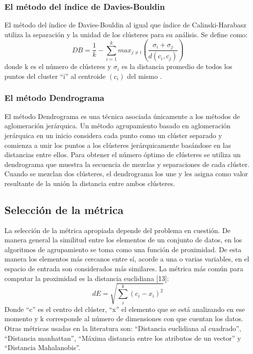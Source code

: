 \subsubsection{El método del índice de Davies-Bouldin }
El método del índice de Davies-Bouldin al igual que índice de Calinski-Harabasz utiliza la separación y la unidad de los clústeres para su análisis. Se define como:
\begin{equation}
DB = \frac{1}{k} - \sum_{i = 1}^{k} max_{j \neq i}(\frac{\sigma_i + \sigma_j}{d(c_i,c_j)})
\end{equation}
donde  k  es el número de clústeres y $\sigma_i$ es la distancia promedio de todos los puntos del cluster “i” al centroide $(c_i)$ del mismo \cite{Petrovic2006ACB}.
\subsubsection{El método Dendrograma }
El método Dendrograma es una técnica asociada únicamente a los métodos de aglomeración jerárquica. Un método agrupamiento basado en aglomeración jerárquica en un inicio considera cada punto como un clúster separado y comienza a unir los puntos a los clústeres jerárquicamente basándose en las distancias entre ellos. 
Para obtener el número óptimo de clústeres se utiliza un dendrograma que muestra la secuencia de mezclas y separaciones de cada clúster. Cuando se mezclan dos clústeres, el dendrograma los une y les asigna como valor resultante de la unión la distancia entre ambos clústeres.


\subsection{Selección de la métrica}
La selección de la métrica apropiada depende del problema en cuestión. De manera general la similitud entre los elementos de un conjunto de datos, en los algoritmos de agrupamiento se toma como una función de proximidad. De esta manera los elementos más cercanos entre sí, acorde a una o varias variables, en el espacio de entrada son considerados más similares. La métrica más común para computar la proximidad es la distancia euclidiana [13]: 
\begin{equation}
	dE = \sqrt{\sum_{i}^{k}(c_i -x_i)^2}
\end{equation}
Donde “c” es el centro del clúster, “x” el elemento que se está analizando en ese momento y k corresponde al número de dimensiones con que cuentan los datos. Otras métricas usadas en la literatura son: “Distancia euclidiana al cuadrado”, “Distancia manhattan”, “Máxima distancia entre los atributos de un vector” y “Distancia Mahalanobis”. 
